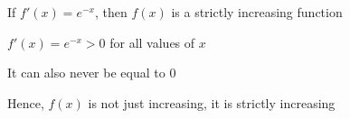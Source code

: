 \documentclass[14pt,fleqn]{extarticle}
\begin{document}
 
\begin{snippet}
    \correct
    
    If $f'(x) = e^{-x}$, then $f(x)$ is a strictly increasing function 
    
    \reason
    
    $f'(x) = e^{-x} > 0$ for all values of $x$\newline 
    
    It can also never be equal to $0$ \newline 
    
    Hence, $f(x)$ is not just increasing, it is strictly increasing 
    
\end{snippet} 
\end{document}
